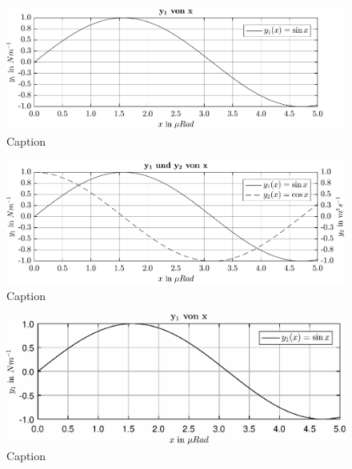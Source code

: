 \blindtext[1]
\begin{figure}[H]
    \centering
    \includegraphics{graphics/dummy/fig_y1.pdf}
    \caption{Caption}
    \label{fig:my_label}
\end{figure}
\begin{figure}[H]
    \centering
    \includegraphics{graphics/dummy/fig_y2.pdf}
    \caption{Caption}
    \label{fig:my_label}
\end{figure}
\blindtext[1]
\begin{figure}[H]
    \centering
    \includegraphics{graphics/dummy/fig_y1.eps}
    \caption{Caption}
    \label{fig:my_label}
\end{figure}